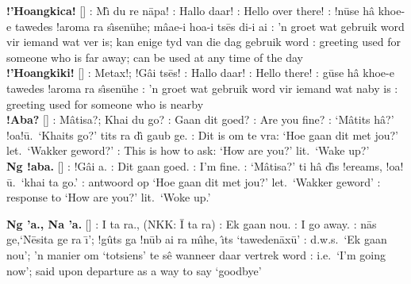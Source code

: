 \textbf{!'Hoangkica!} []
: M\^{\i} du re \textdoublevertline{}n\={a}pa!
: Hallo daar! : Hello over there!
: !n\={u}se h\^{a} khoe-e tawedes !aroma ra
s\^{\i}sen\={u}he; m\^{a}\textdoublevertline{}ae-i hoa-i ts\={e}s di-i
ai : 'n groet wat gebruik word vir iemand wat ver is;
kan enige tyd van die dag gebruik word : greeting used
for someone who is far away; can be used at any time of the day \\

\textbf{!'Hoangkiki!} [] : Metax!; !G\^{a}i
ts\={e}s! : Hallo daar! : Hello there!
: \textvertline{}g\={u}se h\^{a} khoe-e tawedes !aroma
ra s\^{\i}sen\={u}he : 'n groet wat gebruik word vir
iemand wat naby is : greeting used for someone who is
nearby \\

\textbf{!Aba?} [] :
M\^{a}tisa?; \textdoublebarpipe{}Khai du go? : Gaan dit
goed? : Are you fine? : `M\^{a}tits
h\^{a}?' !oa!\={u}.\ `\textdoublebarpipe{}Khaits go?' tits ra d\^{\i}
\textvertline{}gaub ge. : Dit is om te vra: `Hoe gaan
dit met jou?' let.\ `Wakker geword?' : This is how to
ask: `How are you?' lit.\ `Wake up?' \\

\textbf{Ng !aba.} [] :
!G\^{a}i a. : Dit gaan goed. : I'm fine.
: `M\^{a}tisa?' ti h\^{a} d\^{\i}s !ereams, !oa!\={u}.\
`\textdoublebarpipe{}khai ta go.' : antwoord op `Hoe
gaan dit met jou?' let.\ `Wakker geword' \underbar{Eng}: response to
`How are you?' lit.\ `Woke up.' \\

\newpage

\textbf{Ng \textdoublevertline{}'a., Na \textdoublevertline{}'a.}
[]
: I ta ra., (NKK: \={I} ta ra) : Ek gaan
nou. \underbar{Eng}: I go away. \underbar{Nama}:
\textdoublevertline{}n\={a}s ge,`N\={e}sita ge ra \={\i}'; !g\^{u}ts
ga !n\={u}b ai ra m\^{\i}he, \^{\i}ts
`tawede\textdoublevertline{}n\={a}x\={u}' : d.w.s.\ `Ek
gaan nou'; 'n manier om `totsiens' te s\^{e} wanneer daar vertrek word
\underbar{Eng}: i.e.\ `I'm going now'; said upon departure as a way to
say `goodbye' \\

